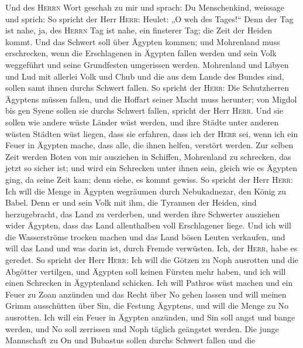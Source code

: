  Und des \textsc{Herrn} Wort geschah zu mir und sprach:
 Du Menschenkind, weissage und sprich: So spricht der Herr
\textsc{Herr}: Heulet: „O weh des Tages!{}``  Denn der Tag
ist nahe, ja, des \textsc{Herrn} Tag ist nahe, ein finsterer Tag; die
Zeit der Heiden kommt.  Und das Schwert soll über Ägypten
kommen; und Mohrenland muss erschrecken, wenn die Erschlagenen in
Ägypten fallen werden und sein Volk weggeführt und seine Grundfesten
umgerissen werden.  Mohrenland und Libyen und Lud mit
allerlei Volk und Chub und die aus dem Lande des Bundes sind, sollen
samt ihnen durchs Schwert fallen.  So spricht der
\textsc{Herr}: Die Schutzherren Ägyptens müssen fallen, und die Hoffart
seiner Macht muss herunter; von Migdol bis gen Syene sollen sie durchs
Schwert fallen, spricht der Herr \textsc{Herr}.  Und sie
sollen wie andere wüste Länder wüst werden, und ihre Städte unter
anderen wüsten Städten wüst liegen,  dass sie erfahren,
dass ich der \textsc{Herr} sei, wenn ich ein Feuer in Ägypten mache,
dass alle, die ihnen helfen, verstört werden.  Zur selben
Zeit werden Boten von mir ausziehen in Schiffen, Mohrenland zu
schrecken, das jetzt so sicher ist; und wird ein Schrecken unter ihnen
sein, gleich wie es Ägypten ging, da seine Zeit kam; denn siehe, es
kommt gewiss.  So spricht der Herr \textsc{Herr}: Ich
will die Menge in Ägypten wegräumen durch Nebukadnezar, den König zu
Babel.  Denn er und sein Volk mit ihm, die Tyrannen der
Heiden, sind herzugebracht, das Land zu verderben, und werden ihre
Schwerter ausziehen wider Ägypten, dass das Land allenthalben voll
Erschlagener liege.  Und ich will die Wasserströme
trocken machen und das Land bösen Leuten verkaufen, und will das Land
und was darin ist, durch Fremde verwüsten. Ich, der \textsc{Herr}, habe
es geredet.  So spricht der Herr \textsc{Herr}: Ich will
die Götzen zu Noph ausrotten und die Abgötter vertilgen, und Ägypten
soll keinen Fürsten mehr haben, und ich will einen Schrecken in
Ägyptenland schicken.  Ich will Pathros wüst machen und
ein Feuer zu Zoan anzünden und das Recht über No gehen lassen
 und will meinen Grimm ausschütten über Sin, die Festung
Ägyptens, und will die Menge zu No ausrotten.  Ich will
ein Feuer in Ägypten anzünden, und Sin soll angst und bange werden, und
No soll zerrissen und Noph täglich geängstet werden.  Die
junge Mannschaft zu On und Bubastus sollen durchs Schwert fallen und die
